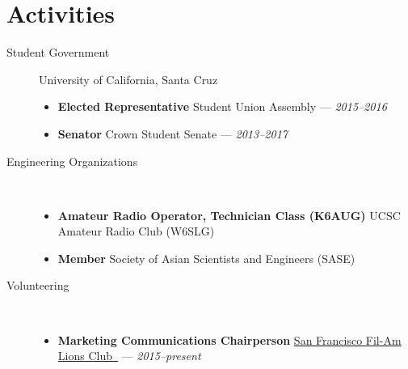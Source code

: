 \documentclass[10pt]{article}
\let\orighref\href%
\renewcommand{\href}[2]{\orighref{#1}{#2{\scriptsize~\color{darkgray}\faExternalLink}}}
\begin{document}
\section*{Activities}
\begin{description}
  \item[Student Government] University of California, Santa Cruz
    \begin{itemize}
      \item \textbf{Elected Representative} Student Union Assembly --- \textit{2015--2016}
      \item \textbf{Senator} Crown Student Senate --- \textit{2013--2017}
    \end{itemize}
  \item[Engineering Organizations]~%
    \begin{itemize}
      \item \textbf{Amateur Radio Operator, Technician Class (K6AUG)} UCSC Amateur Radio Club (W6SLG)
      \item \textbf{Member} Society of Asian Scientists and Engineers (SASE)
    \end{itemize}
  \item[Volunteering]~%
    \begin{itemize}
      \item \textbf{Marketing Communications Chairperson}
        \href{http://SFFilAmLions.org}{San Francisco Fil-Am Lions Club} --- \textit{2015--present}
    \end{itemize}

\end{description}
\begin{comment}
\item[Relevant Hobbies] ~
  \begin{itemize}
    \item \textbf{\href{https://coord.info/PR62PFW}{Geocaching (4U6U57)}} 350
      finds
    \item \textbf{Pokemon Go} Team Instinct, Level 21
    \item \textbf{Ingress} Enlightened, Level 5
    \item \textbf{Google Maps Contributor/Local Guide} Level 5, formerly Google
      Maps Maker with 500+ edits
  \end{itemize}
\end{comment}
\end{document}
